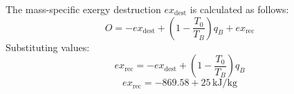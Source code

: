 The mass-specific exergy destruction \( ex_{\text{dest}} \) is calculated as follows:  
\[
O = -ex_{\text{dest}} + \left( 1 - \frac{T_0}{T_B} \right) q_B + ex_{\text{rec}}
\]  
Substituting values:  
\[
ex_{\text{rec}} = -ex_{\text{dest}} + \left( 1 - \frac{T_0}{T_B} \right) q_B
\]  
\[
ex_{\text{rec}} = -869.58 + 25 \, \text{kJ/kg}
\]